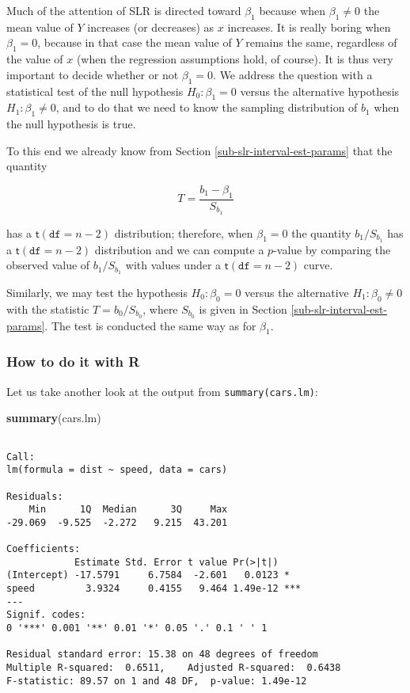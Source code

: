 \documentclass[]{book}
\newenvironment{Shaded}{\begin{snugshade}}{\end{snugshade}}
\newcommand{\KeywordTok}[1]{\textcolor[rgb]{0.13,0.29,0.53}{\textbf{{#1}}}}
\newcommand{\NormalTok}[1]{{#1}}
\numberwithin{equation}{chapter}
\numberwithin{figure}{chapter}
\theoremstyle{plain}
\theoremstyle{definition}
\theoremstyle{remark}
\theoremstyle{definition}
\theoremstyle{definition}
\theoremstyle{remark}
\begin{document}
Much of the attention of SLR is directed toward \(\beta_{1}\) because
when \(\beta_{1}\neq 0\) the mean value of \(Y\) increases (or
decreases) as \(x\) increases. It is really boring when \(\beta_{1}=0\),
because in that case the mean value of \(Y\) remains the same,
regardless of the value of \(x\) (when the regression assumptions hold,
of course). It is thus very important to decide whether or not
\(\beta_{1} = 0\). We address the question with a statistical test of
the null hypothesis \(H_{0}:\beta_{1}=0\) versus the alternative
hypothesis \(H_{1}:\beta_{1}\neq0\), and to do that we need to know the
sampling distribution of \(b_{1}\) when the null hypothesis is true.

To this end we already know from Section
\ref{sub-slr-interval-est-params} that the quantity

\begin{equation} 
T=\frac{b_{1}-\beta_{1}}{S_{b_{1}}}
\end{equation}

has a \(\mathsf{t}(\mathtt{df}=n-2)\) distribution; therefore, when
\(\beta_{1}=0\) the quantity \(b_{1}/S_{b_{1}}\) has a
\(\mathsf{t}(\mathtt{df}=n-2)\) distribution and we can compute a
\(p\)-value by comparing the observed value of \(b_{1}/S{}_{b_{1}}\)
with values under a \(\mathsf{t}(\mathtt{df}=n-2)\) curve.

Similarly, we may test the hypothesis \(H_{0}:\beta_{0}=0\) versus the
alternative \(H_{1}:\beta_{0}\neq0\) with the statistic
\(T=b_{0}/S_{b_{0}}\), where \(S_{b_{0}}\) is given in Section
\ref{sub-slr-interval-est-params}. The test is conducted the same way as
for \(\beta_{1}\).

\subsubsection{How to do it with R}\label{how-to-do-it-with-r-44}

Let us take another look at the output from \texttt{summary(cars.lm)}:

\begin{Shaded}
\begin{Highlighting}[]
\KeywordTok{summary}\NormalTok{(cars.lm)}
\end{Highlighting}
\end{Shaded}

\begin{verbatim}

Call:
lm(formula = dist ~ speed, data = cars)

Residuals:
    Min      1Q  Median      3Q     Max 
-29.069  -9.525  -2.272   9.215  43.201 

Coefficients:
            Estimate Std. Error t value Pr(>|t|)    
(Intercept) -17.5791     6.7584  -2.601   0.0123 *  
speed         3.9324     0.4155   9.464 1.49e-12 ***
---
Signif. codes:  
0 '***' 0.001 '**' 0.01 '*' 0.05 '.' 0.1 ' ' 1

Residual standard error: 15.38 on 48 degrees of freedom
Multiple R-squared:  0.6511,    Adjusted R-squared:  0.6438 
F-statistic: 89.57 on 1 and 48 DF,  p-value: 1.49e-12
\end{verbatim}
\end{document}

